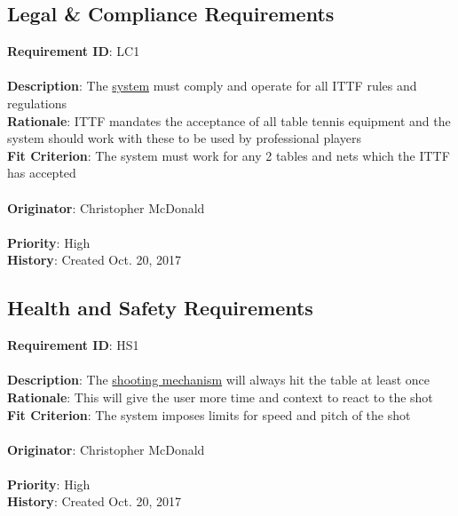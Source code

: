 \documentclass[11pt]{article}
\begin{document}
\subsection{Legal \& Compliance Requirements}
\begin{framed}
	\noindent\textbf{Requirement ID}: LC1 \hfill\\\\
	\noindent\textbf{Description}: The \hyperref[sec:definitions]{system} must comply and operate for all ITTF rules and regulations \\
	\textbf{Rationale}: ITTF mandates the acceptance of all table tennis equipment and the system should work with these to be used by professional players \\
	\textbf{Fit Criterion}: The system must work for any 2 tables and nets which the ITTF has accepted \\\\
	\textbf{Originator}: Christopher McDonald \\\\
	\textbf{Priority}: High \hfill \\
	\noindent\textbf{History}: Created Oct. 20, 2017
\end{framed}
\subsection{Health and Safety Requirements}
\begin{framed}
	\noindent\textbf{Requirement ID}: HS1 \hfill\\\\
	\noindent\textbf{Description}: The \hyperref[sec:definitions]{shooting mechanism} will always hit the table at least once  \\
	\textbf{Rationale}: This will give the user more time and context to react to the shot \\
	\textbf{Fit Criterion}: The system imposes limits for speed and pitch of the shot \\\\
	\textbf{Originator}: Christopher McDonald \\\\
	\textbf{Priority}: High \hfill \\
	\noindent\textbf{History}: Created Oct. 20, 2017
\end{framed}
\end{document}
